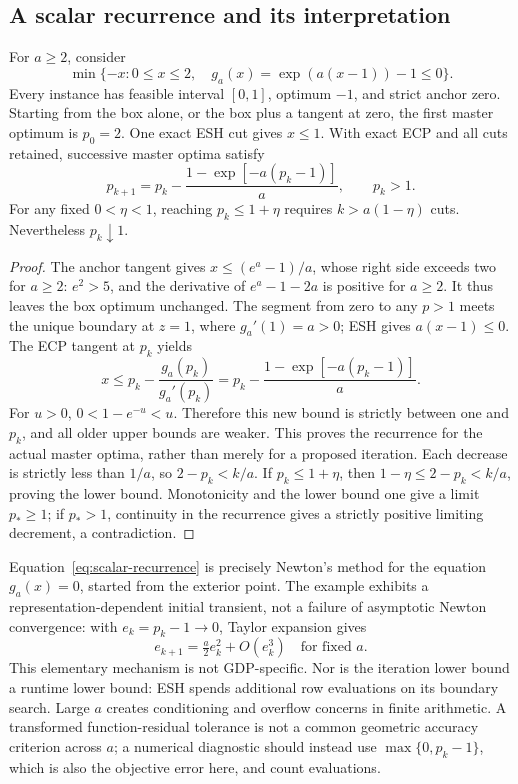 \subsection{A scalar recurrence and its interpretation}
\begin{proposition}\label{prop:scalar}
For $a\ge2$, consider
\begin{equation}\label{eq:scalar}
 \min\{-x:0\le x\le2,\quad g_a(x)=\exp(a(x-1))-1\le0\}.
\end{equation}
Every instance has feasible interval $[0,1]$, optimum $-1$, and strict anchor zero. Starting from the box alone, or the box plus a tangent at zero, the first master optimum is $p_0=2$. One exact ESH cut gives $x\le1$. With exact ECP and all cuts retained, successive master optima satisfy
\begin{equation}\label{eq:scalar-recurrence}
 p_{k+1}=p_k-\frac{1-\exp[-a(p_k-1)]}{a},\qquad p_k>1.
\end{equation}
For any fixed $0<\eta<1$, reaching $p_k\le1+\eta$ requires $k>a(1-\eta)$ cuts. Nevertheless $p_k\downarrow1$.
\end{proposition}
\begin{proof}
The anchor tangent gives $x\le(e^a-1)/a$, whose right side exceeds two for $a\ge2$: $e^2>5$, and the derivative of $e^a-1-2a$ is positive for $a\ge2$. It thus leaves the box optimum unchanged. The segment from zero to any $p>1$ meets the unique boundary at $z=1$, where $g_a'(1)=a>0$; ESH gives $a(x-1)\le0$. The ECP tangent at $p_k$ yields
\[
 x\le p_k-\frac{g_a(p_k)}{g_a'(p_k)}
 =p_k-\frac{1-\exp[-a(p_k-1)]}{a}.
\]
For $u>0$, $0<1-e^{-u}<u$. Therefore this new bound is strictly between one and $p_k$, and all older upper bounds are weaker. This proves the recurrence for the actual master optima, rather than merely for a proposed iteration. Each decrease is strictly less than $1/a$, so $2-p_k<k/a$. If $p_k\le1+\eta$, then $1-\eta\le2-p_k<k/a$, proving the lower bound. Monotonicity and the lower bound one give a limit $p_*\ge1$; if $p_*>1$, continuity in the recurrence gives a strictly positive limiting decrement, a contradiction.
\end{proof}
Equation~\eqref{eq:scalar-recurrence} is precisely Newton's method for the equation $g_a(x)=0$, started from the exterior point. The example exhibits a representation-dependent initial transient, not a failure of asymptotic Newton convergence: with $e_k=p_k-1\to0$, Taylor expansion gives
\[
 e_{k+1}=\tfrac{a}{2}e_k^2+O(e_k^3)\quad\text{for fixed }a.
\]
This elementary mechanism is not GDP-specific. Nor is the iteration lower bound a runtime lower bound: ESH spends additional row evaluations on its boundary search. Large $a$ creates conditioning and overflow concerns in finite arithmetic. A transformed function-residual tolerance is not a common geometric accuracy criterion across $a$; a numerical diagnostic should instead use $\max\{0,p_k-1\}$, which is also the objective error here, and count evaluations.

